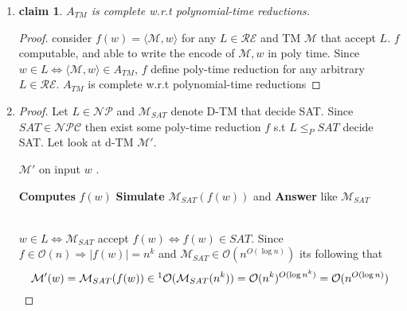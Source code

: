 \documentclass[12pt]{article}
\newtheorem*{claim*}{claim}
\begin{document}
\begin{enumerate}[label=(\alph*)]
\item {}
\begin{claim*} $A_{TM}$ is complete w.r.t polynomial-time reductions.
\end{claim*}
\begin{proof} consider $f(w)=\langle \mathcal{M} ,w \rangle$ for any
 $L\in \mathcal{RE}$ and TM $\mathcal{M}$ that accept $L$. $f$ computable, and able to write the encode of $\mathcal{M} ,w $  in poly time.  Since $w\in L \Leftrightarrow 
\langle \mathcal{M} ,w \rangle \in A_{TM} $,  $f$ define poly-time reduction for any arbitrary $L \in \mathcal{RE}$. $A_{TM}$ is complete w.r.t polynomial-time reductions\end{proof}
\item {}
\begin{proof}
Let $L\in \mathcal{NP}$ and $\mathcal{M}_{SAT}$ denote D-TM  that decide SAT. Since $SAT\in\mathcal{NPC}$ then exist some poly-time reduction $f$ s.t  $L\le_PSAT$ decide SAT. Let look at d-TM $\mathcal{M}'$.
\begin{algorithm}
\caption{ $\mathcal{M}'$ on input $w$ .}\label{alg:cap}
\begin{algorithmic} 
\State  \textbf{Computes}  $f(w)$
\State \textbf{Simulate} $\mathcal{M}_{SAT}(f(w))$
and \textbf{Answer} like $\mathcal{M}_{SAT}$
\end{algorithmic}
\end{algorithm}\\
$w\in L \Leftrightarrow \mathcal{M}_{SAT}$ accept $f(w) \Leftrightarrow f(w) \in SAT$. Since $f\in \mathcal{O}(n)\Rightarrow |f(w)|=n^k$ and $\mathcal{M}_{SAT}\in \mathcal{O}{(n^{O(\log n)})}$ its following that
\[ \mathcal{M}'(w)=\mathcal{M}_{SAT}(f(w))\in\footnote{Not realy sure if its the proper way to write it.}\mathcal{O}(\mathcal{M}_{SAT}(n^k))= \mathcal{O}(n^k)^{O(\log n^k)}=\mathcal{O}(n^{O(\log n)})
\]
\end{proof}
\end{enumerate}
\pagebreak
\end{document}
